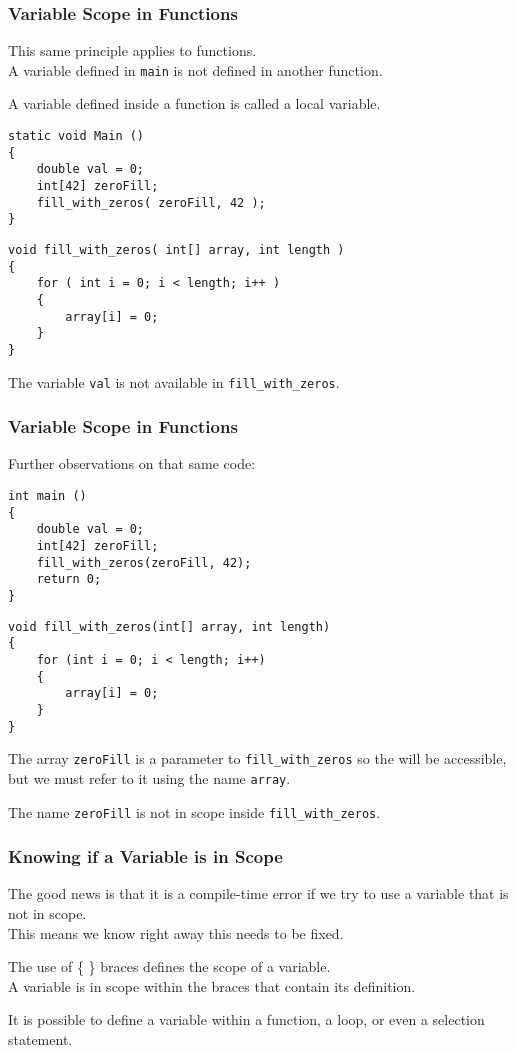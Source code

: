 \begin{frame}[fragile]
\frametitle{Variable Scope in Functions}
This same principle applies to functions.\\
\quad A variable defined in \texttt{main} is not defined in another function.

A variable defined inside a function is called a \alert{local variable}.

{\scriptsize
\begin{verbatim}
static void Main ()
{
    double val = 0;
    int[42] zeroFill;
    fill_with_zeros( zeroFill, 42 );
}
\end{verbatim}
}

{\scriptsize
\begin{verbatim}
void fill_with_zeros( int[] array, int length ) 
{
    for ( int i = 0; i < length; i++ )
    {
        array[i] = 0;
    }
}    
\end{verbatim}
}

The variable \texttt{val} is not available in \texttt{fill\_with\_zeros}.

\end{frame}

\begin{frame}[fragile]
\frametitle{Variable Scope in Functions}
Further observations on that same code:

{\scriptsize
\begin{verbatim}
int main ()
{
    double val = 0;
    int[42] zeroFill;
    fill_with_zeros(zeroFill, 42);
    return 0;
}
\end{verbatim}
}

{\scriptsize
\begin{verbatim}
void fill_with_zeros(int[] array, int length) 
{
    for (int i = 0; i < length; i++)
    {
        array[i] = 0;
    }
}    
\end{verbatim}
}


The array \texttt{zeroFill} is a parameter to \texttt{fill\_with\_zeros} so the will be accessible, but we must refer to it using the name \texttt{array}.

The name \texttt{zeroFill} is not in scope inside \texttt{fill\_with\_zeros}.

\end{frame}

\begin{frame}
\frametitle{Knowing if a Variable is in Scope}
The good news is that it is a compile-time error if we try to use a variable that is not in scope.\\
\quad This means we know right away this needs to be fixed.

The use of \{ \} braces defines the scope of a variable.\\
\quad A variable is in scope within the braces that contain its definition.

It is possible to define a variable within a function, a loop, or even a selection statement. 

\end{frame}

